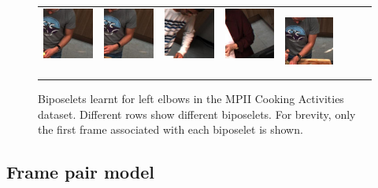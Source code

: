 \documentclass[runningheads]{llncs}
\begin{document}
\begin{figure}[t]
\begin{center}
\begin{tabular}{@{}c@{}c@{}c@{}c@{}c@{}c@{}c@{}c@{}}
\includegraphics[height=0.1375\linewidth]{figures/biposelets/poselet-297/sample-3-f0.jpg}\,&
\includegraphics[height=0.1375\linewidth]{figures/biposelets/poselet-297/sample-4-f0.jpg}\,&
\includegraphics[height=0.1375\linewidth]{figures/biposelets/poselet-297/sample-5-f0.jpg}\,&
\includegraphics[height=0.1375\linewidth]{figures/biposelets/poselet-297/sample-6-f0.jpg}\,&
\includegraphics[height=0.1375\linewidth]{figures/biposelets/poselet-297/sample-7-f0.jpg}\\
\end{tabular}
\end{center}
\caption{Biposelets learnt for left elbows in the MPII Cooking Activities
dataset. Different rows show different biposelets. For brevity,
only the first frame associated with each biposelet is shown.}
\label{fig:biposelets}
\end{figure}


\subsection{Frame pair model}
\end{document}
